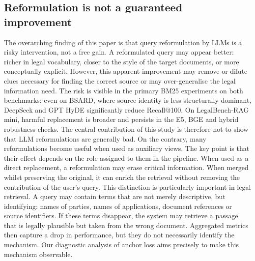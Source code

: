 \documentclass[a4paper,fleqn]{cas-dc}
\begin{document}
\subsection{Reformulation is not a guaranteed improvement}
\label{sec:disc-not-guaranteed}
The overarching finding of this paper is that query reformulation by LLMs is a risky intervention, not a free gain. A reformulated query may appear better: richer in legal vocabulary, closer to the style of the target documents, or more conceptually explicit. However, this apparent improvement may remove or dilute clues necessary for finding the correct source or may over-generalise the legal information need. The risk is visible in the primary BM25 experiments on both benchmarks: even on BSARD, where source identity is less structurally dominant, DeepSeek and GPT HyDE significantly reduce Recall@100. On LegalBench-RAG mini, harmful replacement is broader and persists in the E5, BGE and hybrid robustness checks.
The central contribution of this study is therefore not to show that LLM reformulations are generally bad. On the contrary, many reformulations become useful when used as auxiliary views. The key point is that their effect depends on the role assigned to them in the pipeline. When used as a direct replacement, a reformulation may erase critical information. When merged whilst preserving the original, it can enrich the retrieval without removing the contribution of the user’s query.
This distinction is particularly important in legal retrieval. A query may contain terms that are not merely descriptive, but identifying: names of parties, names of applications, document references or source identifiers. If these terms disappear, the system may retrieve a passage that is legally plausible but taken from the wrong document. Aggregated metrics then capture a drop in performance, but they do not necessarily identify the mechanism. Our diagnostic analysis of anchor loss aims precisely to make this mechanism observable.
\end{document}
